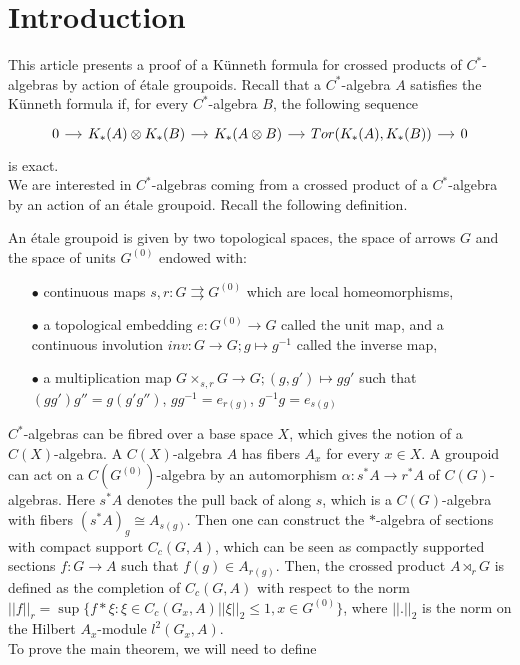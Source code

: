 \section{Introduction}

This article presents a proof of a Künneth formula for crossed products of $C^*$-algebras by action of \'etale groupoids. Recall that a $C^*$-algebra $A$ satisfies the Künneth formula if, for every $C^*$-algebra $B$, the following sequence 
\[\begin{tikzcd}[column sep = small] 
0 \arrow{r} & K_*(A)\otimes K_*(B)\arrow{r} & K_*(A\otimes B) \arrow{r} & Tor(K_*(A),K_*(B))\arrow{r} & 0 
\end{tikzcd}\]
is exact. \\

We are interested in $C^*$-algebras coming from a crossed product of a $C^*$-algebra by an action of an \'etale groupoid. Recall the following definition.

\begin{definition}
An étale groupoid is given by two topological spaces, the space of arrows $G$ and the space of units $G^{(0)}$ endowed with:
\begin{itemize}
\item[$\bullet$] continuous maps $s,r : G \rightrightarrows G^{(0)}$ which are local homeomorphisms,
\item[$\bullet$] a topological embedding $e: G^{(0)}\rightarrow G$ called the unit map, and a continuous involution $inv : G\rightarrow G; g\mapsto g^{-1}$ called the inverse map,
\item[$\bullet$] a multiplication map $G\times_{s,r}G\rightarrow G; (g,g')\mapsto gg'$ such that $(gg')g'' = g(g'g'')$, $gg^{-1}= e_{r(g)}$, $g^{-1}g= e_{s(g)}$
\end{itemize}
\end{definition}

$C^*$-algebras can be fibred over a base space $X$, which gives the notion of a $C(X)$-algebra. A $C(X)$-algebra $A$ has fibers $A_x$ for every $x\in X$. A groupoid can act on a $C(G^{(0)})$-algebra by an automorphism $\alpha : s^* A \rightarrow r^* A $ of $C(G)$-algebras. Here $s^* A$ denotes the pull back of along $s$, which is a $C(G)$-algebra with fibers $(s^* A)_g \cong A_{s(g)}$. Then one can construct the $*$-algebra of sections with compact support $C_c(G,A)$, which can be seen as compactly supported sections $f : G \rightarrow A$ such that $f(g)\in A_{r(g)}$. Then, the crossed product $A\rtimes_r G$ is defined as the completion of $C_c(G,A)$ with respect to the norm $||f||_r =\sup \{f \ast \xi : \xi \in C_c(G_x,A)||\xi||_2\leq 1,x\in G^{(0)}\}$, where $||.||_2$ is the norm on the Hilbert $A_x$-module $l^2(G_x,A)$.\\
 

To prove the main theorem, we will need to define 

